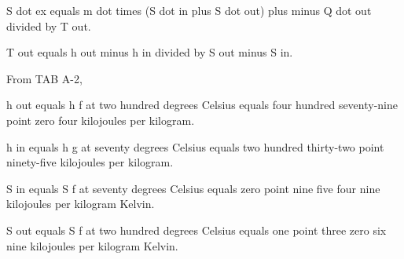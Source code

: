 S dot ex equals m dot times (S dot in plus S dot out) plus minus Q dot out divided by T out.

T out equals h out minus h in divided by S out minus S in.

From TAB A-2,

h out equals h f at two hundred degrees Celsius equals four hundred seventy-nine point zero four kilojoules per kilogram.

h in equals h g at seventy degrees Celsius equals two hundred thirty-two point ninety-five kilojoules per kilogram.

S in equals S f at seventy degrees Celsius equals zero point nine five four nine kilojoules per kilogram Kelvin.

S out equals S f at two hundred degrees Celsius equals one point three zero six nine kilojoules per kilogram Kelvin.